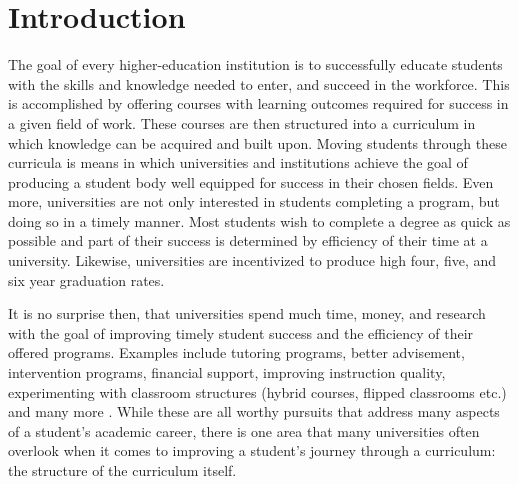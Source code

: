 \documentclass[botnum, fleqn]{unmeethesis}
\begin{document}
\mainmatter


\chapter{Introduction}
  The goal of every higher-education institution is to successfully educate students with the skills and knowledge needed to enter, and succeed in the workforce. This is accomplished by offering courses with learning outcomes required for success in a given field of work. These courses are then structured into a curriculum in which knowledge can be acquired and built upon. Moving students through these curricula is means in which universities and institutions achieve the goal of producing a student body well equipped for success in their chosen fields. Even more, universities are not only interested in students completing a program, but doing so in a timely manner. Most students wish to complete a degree as quick as possible and part of their success is determined by efficiency of their time at a university. Likewise, universities are incentivized to produce high four, five, and six year graduation rates.

  It is no surprise then, that universities spend much time, money, and research with the goal of improving timely student success and the efficiency of their offered programs. Examples include tutoring programs, better advisement, intervention programs, financial support, improving instruction quality, experimenting with classroom structures (hybrid courses, flipped classrooms etc.) and many more \cite{o2015use,topping1996effectiveness,hunter2004could,king2002identifying,lewallen1993early}. While these are all worthy pursuits that address many aspects of a student's academic career, there is one area that many universities often overlook when it comes to improving a student's journey through a curriculum: the structure of the curriculum itself.
\end{document}

